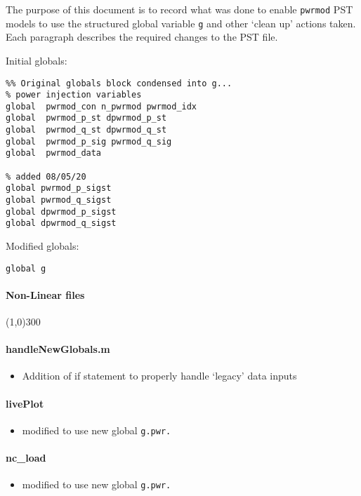\documentclass[12pt]{article}
\begin{document}
The purpose of this document is to record what was done to enable \verb|pwrmod| PST models to use the structured global variable \verb|g| and other `clean up' actions taken. \\
Each paragraph describes the required changes to the PST file.

Initial globals:
\begin{verbatim}
%% Original globals block condensed into g...
% power injection variables
global  pwrmod_con n_pwrmod pwrmod_idx
global  pwrmod_p_st dpwrmod_p_st
global  pwrmod_q_st dpwrmod_q_st
global  pwrmod_p_sig pwrmod_q_sig
global  pwrmod_data

% added 08/05/20
global pwrmod_p_sigst
global pwrmod_q_sigst
global dpwrmod_p_sigst
global dpwrmod_q_sigst

\end{verbatim}

Modified globals:
\begin{verbatim}
global g
\end{verbatim}
\paragraph{Non-Linear files}\line(1,0){300}
\paragraph{handleNewGlobals.m}
	\begin{itemize}
		\item Addition of if statement to properly handle `legacy' data inputs
	\end{itemize}
\paragraph{livePlot}
	\begin{itemize}
		\item modified to use new global \verb|g.pwr.|
	\end{itemize}
\paragraph{nc\_load}
	\begin{itemize}
		\item modified to use new global \verb|g.pwr.|
	\end{itemize}
\end{document}
